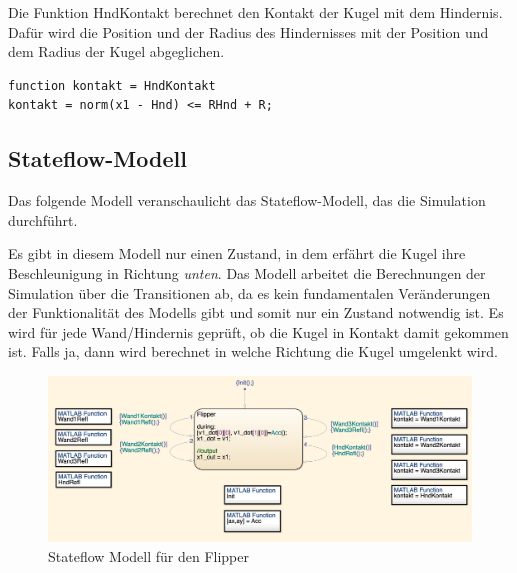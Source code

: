\documentclass[]{scrartcl}
\begin{document}
Die Funktion HndKontakt berechnet den Kontakt der Kugel mit dem Hindernis. Dafür wird die Position und der Radius des Hindernisses mit der Position und dem Radius der Kugel abgeglichen.

\begin{lstlisting}
function kontakt = HndKontakt
kontakt = norm(x1 - Hnd) <= RHnd + R;
\end{lstlisting}

\subsection{Stateflow-Modell}

Das folgende Modell veranschaulicht das Stateflow-Modell, das die Simulation durchführt.

Es gibt in diesem Modell nur einen Zustand, in dem erfährt die Kugel ihre Beschleunigung in Richtung \textit{unten}. Das Modell arbeitet die Berechnungen der Simulation über die Transitionen ab, da es kein fundamentalen Veränderungen der Funktionalität des Modells gibt und somit nur ein Zustand notwendig ist. Es wird für jede Wand/Hindernis geprüft, ob die Kugel in Kontakt damit gekommen ist. Falls ja, dann wird berechnet in welche Richtung die Kugel umgelenkt wird.

\begin{figure}[H]
\centering
\includegraphics[width=1\linewidth]{./flipper_modell}
\caption{Stateflow Modell für den Flipper}
\label{fig:flipper_modell}
\end{figure}
\end{document}
